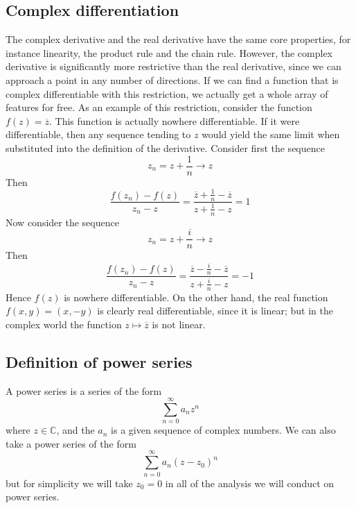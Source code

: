 \subsection{Complex differentiation}
The complex derivative and the real derivative have the same core properties, for instance linearity, the product rule and the chain rule.
However, the complex derivative is significantly more restrictive than the real derivative, since we can approach a point in any number of directions.
If we can find a function that is complex differentiable with this restriction, we actually get a whole array of features for free.
As an example of this restriction, consider the function \(f(z) = \overline{z}\).
This function is actually nowhere differentiable.
If it were differentiable, then any sequence tending to \(z\) would yield the same limit when substituted into the definition of the derivative.
Consider first the sequence
\[
	z_n = z + \frac{1}{n} \to z
\]
Then
\[
	\frac{f(z_n) - f(z)}{z_n - z} = \frac{\overline{z} + \frac{1}{n} - \overline{z}}{z + \frac{1}{n} - z} = 1
\]
Now consider the sequence
\[
	z_n = z + \frac{i}{n} \to z
\]
Then
\[
	\frac{f(z_n) - f(z)}{z_n - z} = \frac{\overline{z} - \frac{i}{n} - \overline{z}}{z + \frac{i}{n} - z} = -1
\]
Hence \(f(z)\) is nowhere differentiable.
On the other hand, the real function \(f(x, y) = (x, -y)\) is clearly real differentiable, since it is linear; but in the complex world the function \(z \mapsto \overline{z}\) is not linear.

\subsection{Definition of power series}
A power series is a series of the form
\[
	\sum_{n=0}^\infty a_n z^n
\]
where \(z \in \mathbb C\), and the \(a_n\) is a given sequence of complex numbers.
We can also take a power series of the form
\[
	\sum_{n=0}^\infty a_n (z-z_0)^n
\]
but for simplicity we will take \(z_0 = 0\) in all of the analysis we will conduct on power series.

